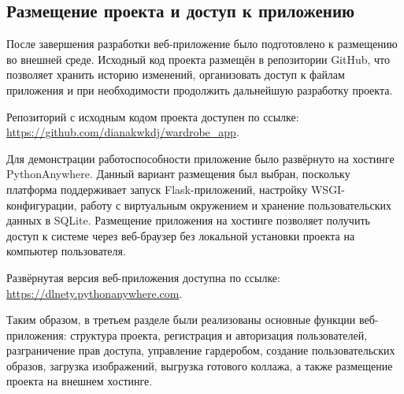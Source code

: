 \subsection{Размещение проекта и доступ к приложению}

После завершения разработки веб-приложение было подготовлено к размещению во внешней среде. Исходный код проекта размещён в репозитории GitHub, что позволяет хранить историю изменений, организовать доступ к файлам приложения и при необходимости продолжить дальнейшую разработку проекта.

Репозиторий с исходным кодом проекта доступен по ссылке: 
\url{https://github.com/dianakwkdj/wardrobe_app}.

Для демонстрации работоспособности приложение было развёрнуто на хостинге PythonAnywhere. Данный вариант размещения был выбран, поскольку платформа поддерживает запуск Flask-приложений, настройку WSGI-конфигурации, работу с виртуальным окружением и хранение пользовательских данных в SQLite. Размещение приложения на хостинге позволяет получить доступ к системе через веб-браузер без локальной установки проекта на компьютер пользователя.

Развёрнутая версия веб-приложения доступна по ссылке: \url{https://dlnety.pythonanywhere.com}.

Таким образом, в третьем разделе были реализованы основные функции веб-приложения: структура проекта, регистрация и авторизация пользователей, разграничение прав доступа, управление гардеробом, создание пользовательских образов, загрузка изображений, выгрузка готового коллажа, а также размещение проекта на внешнем хостинге.